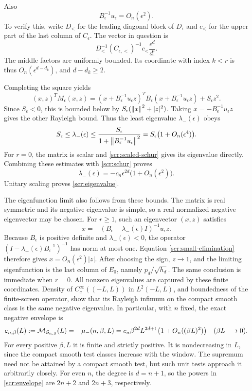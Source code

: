 Also
\begin{equation}\label{scr:small-elimination}
 B_\epsilon^{-1}u_\epsilon=O_n(\epsilon^2).
\end{equation}
To verify this, write \(D_<\) for the leading diagonal block of
\(D_\epsilon\) and \(c_<\) for the upper part of the last
column of \(C_\epsilon\). The vector in question is
\[
 D_<^{-1}(C_{\epsilon,<})^{-1}c_<
                  \frac{\epsilon^d}{d!}.
\]
The middle factors are uniformly bounded. Its coordinate with
index \(k<r\) is thus \(O_n(\epsilon^{d-d_k})\), and
\(d-d_k\ge2\).

Completing the square yields
\[
 (x,z)^TM_\epsilon(x,z)=
 (x+B_\epsilon^{-1}u_\epsilon z)^TB_\epsilon
       (x+B_\epsilon^{-1}u_\epsilon z)+S_\epsilon z^2.
\]
Since \(S_\epsilon<0\), this is bounded below by
\(S_\epsilon(\left\|x\right\|^2+|z|^2)\). Taking
\(x=-B_\epsilon^{-1}u_\epsilon z\) gives the other Rayleigh
bound. Thus the least eigenvalue \(\lambda_-(\epsilon)\) obeys
\[
 S_\epsilon\le\lambda_-(\epsilon)\le
    \frac{S_\epsilon}
           {1+\left\|B_\epsilon^{-1}u_\epsilon\right\|^2}
       =S_\epsilon\bigl(1+O_n(\epsilon^4)\bigr).
\]
For \(r=0\), the matrix is scalar and
\eqref{scr:scaled-schur} gives its eigenvalue directly.
Combining these estimates with \eqref{scr:schur} proves
\[
 \lambda_-(\epsilon)
  =-c_n\epsilon^{2d}\bigl(1+O_n(\epsilon^2)\bigr).
\]
Unitary scaling proves \eqref{scr:eigenvalue}.

The eigenfunction limit also follows from these bounds. The matrix is
real symmetric and its negative eigenvalue is simple, so a real
normalized negative eigenvector may be chosen. For \(r\ge1\),
such an eigenvector \((x,z)\)
satisfies
\[
 x=-(B_\epsilon-\lambda_-(\epsilon)I)^{-1}u_\epsilon z.
\]
Because \(B_\epsilon\) is positive definite and
\(\lambda_-(\epsilon)<0\), the operator
\((I-\lambda_-(\epsilon)B_\epsilon^{-1})^{-1}\)
has norm at most one. Equation \eqref{scr:small-elimination}
therefore gives \(x=O_n(\epsilon^2)|z|\).
After choosing the sign, \(z\to1\), and the limiting eigenfunction
is the last column of \(E_0\), namely \(p_d/\sqrt{h_d}\).
The same conclusion is immediate when \(r=0\).
All nonzero eigenvalues are captured by these finite coordinates.
Density of \(C_c^\infty((-L,L))\) in \(L^2(-L,L)\), and
boundedness of the finite-screen operator, show that its Rayleigh
infimum on the compact smooth class is the same negative eigenvalue.
In particular, with \(n\) fixed, the exact negative envelope is
\begin{equation}\label{scr:envelope}
 e_{n,\beta}(L):=\mathcal M_{\mathcal S_{n,\beta}}(L)
 =-\mu_-(n,\beta,L)
 =c_n\beta^{2d}L^{2d+1}\bigl(1+O_n((\beta L)^2)\bigr)
 \quad(\beta L\longrightarrow0).
\end{equation}
For every positive \(\beta,L\) it is finite and strictly positive.
It is nondecreasing in \(L\), since the compact smooth test classes
increase with the window. The supremum need not be attained by a
compact smooth test, but such unit tests approach it arbitrarily closely.
For even \(n\), the degree is \(d=n+1\), so the powers in
\eqref{scr:envelope} are \(2n+2\) and \(2n+3\), respectively.


